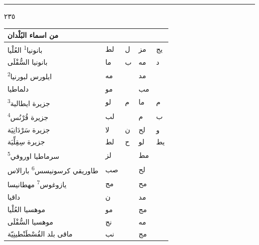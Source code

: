 \documentclass[11pt]{article}
\newcommand{\AbjadZero}{{\NallinoSigns\symbol{"E000}}}
\begin{document}
\par\vspace{3mm}\noindent\rule{40mm}{.4pt}\par{}
\clearpage
{\large \textarabic{٢٣٥}}\par\vspace{1mm}
\begin{Arabic}
\noindent\begin{minipage}[t]{0.495\textwidth}\setlength{\tabcolsep}{2.2pt}\begin{tabular}{|p{55mm}|>{\centering\arraybackslash}p{4.8mm}>{\centering\arraybackslash}p{4.8mm}|>{\centering\arraybackslash}p{4.8mm}>{\centering\arraybackslash}p{4.8mm}|}\hline
\centering من اسماء البُلْدان & \multicolumn{2}{c|}{الطول} & \multicolumn{2}{c|}{العرض} \\ \hline
{}بانونيا\textsuperscript{1} العُلْيا & لط & ل & مز & يج \\
{}بانونيا السُّفْلَى & ما & ب & مه & د \\
{}ايلورس لبورنيا\textsuperscript{2} & مه & \AbjadZero{} & مد & \AbjadZero{} \\
{}دلماطيا & مو & \AbjadZero{} & مب & \AbjadZero{} \\
{}جزيرة ايطالية\textsuperscript{3} & لو & م & ما & م \\
{}جزيرة قُرْنُس\textsuperscript{4} & لب & \AbjadZero{} & م & ب \\
{}جزيرة سَرْدَانِيَة & لا & ن & لح & و \\
{}جزيرة سِقِلِّيَة & لط & ح & لو & يط \\
{}سرماطيا اوروفي\textsuperscript{5} & لز & \AbjadZero{} & مط & \AbjadZero{} \\
{}طاوريقي كرسونيسس\textsuperscript{6} بارالاس & صب & \AbjadZero{} & لح & \AbjadZero{} \\
{}يازوغوس\textsuperscript{7} مهطانيسا & مج &  & مح &  \\
{}داقيا & ن &  & مد &  \\
{}موهسيا العُلْيا & مو &  & مج &  \\
{}موهسيا السُّفْلَى & نج &  & مه &  \\
{}ماقى بلد القُسْطَنْطينِيّة & نب &  & مج &  \\

\end{tabular}
\end{minipage}
\end{Arabic}
\end{document}
